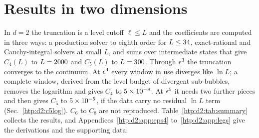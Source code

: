 \section{Results in two dimensions}\label{htp:d2:sec}

In $d=2$ the truncation is a level cutoff $\ell\le L$ and the coefficients are computed in three ways: a production solver
to eighth order for $L\le34$, exact-rational and Cauchy-integral solvers at small $L$, and sums over intermediate
states that give $C_4(L)$ to $L=2000$ and $C_5(L)$ to $L=300$. Through $\epsilon^3$ the truncation converges to the
continuum. At $\epsilon^4$ every window in use diverges like $\ln L$; a complete window, derived from the level budget of
divergent sub-bubbles, removes the logarithm and gives $C_4$ to $5\times10^{-8}$. At $\epsilon^5$ it needs two further pieces
and then gives $C_5$ to $5\times10^{-5}$, if the data carry no residual $\ln L$ term (Sec.~\ref{htp:d2:c5log}). $C_6$ to $C_8$ are not reproduced. Table~\ref{htp:d2:tab:summary} collects the results, and Appendices~\ref{htp:d2:app:eps4} to~\ref{htp:d2:app:legs} give the derivations and the supporting data.

